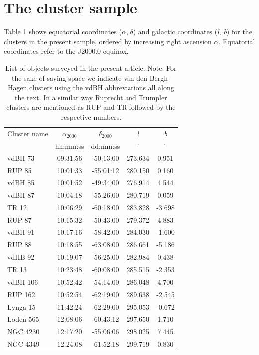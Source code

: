 \documentclass[draft]{aa}
\begin{document}
\section{The cluster sample}
\label{sec:clust_sample}

Table \ref{tab:clust_list} shows equatorial coordinates ($\alpha$, $\delta$) and
galactic coordinates (\textit{l}, \textit{b}) for the clusters in the present
sample, ordered by increasing right ascension $\alpha$. Equatorial coordinates
refer to the J2000.0 equinox.

\begin{table}[ht]
    \centering
    \begin{tabular}{lcccc}
    \hline 
        Cluster name & $\alpha_{2000}$ & $\delta_{2000}$ & \emph{l} & \emph{b}\\
         & hh:mm:ss & dd:mm:ss & $^\circ$ & $^\circ$\\
       \hline \hline 
        vdBH 73 & 09:31:56 & -50:13:00 & 273.634 & 0.951\\
        RUP 85 & 10:01:33 & -55:01:12 &280.150 & 0.160\\
        vdBH 85 & 10:01:52 & -49:34:00 & 276.914 & 4.544\\
        vdBH 87 & 10:04:18 & -55:26:00 & 280.719 & 0.059\\
        TR 12 & 10:06:29 & -60:18:00 & 283.828 & -3.698\\
        RUP 87 & 10:15:32 & -50:43:00 & 279.372 & 4.883\\
        vdBH 91 & 10:17:16 & -58:42:00 & 284.030 & -1.600\\
        RUP 88 & 10:18:55 & -63:08:00 & 286.661 & -5.186\\
        vdHB 92 & 10:19:07 & -56:25:00 & 282.984 & 0.438\\
        TR 13 & 10:23:48 & -60:08:00 & 285.515 & -2.353\\
        vdBH 106 & 10:52:42 & -54:14:00 & 286.048 & 4.700\\
        RUP 162 & 10:52:54 & -62:19:00 & 289.638 & -2.545\\
        Lynga 15 & 11:42:24 & -62:29:00 & 295.053 & -0.672\\
        Loden 565 & 12:08:06 & -60:43:12 & 297.650 & 1.710\\
        NGC 4230 & 12:17:20 & -55:06:06 & 298.025 & 7.445\\
        NGC 4349 & 12:24:08 & -61:52:18 & 299.719 & 0.830\\
        \hline
    \end{tabular}
    \caption{List of objects surveyed in the present article.
    Note: For the sake of saving space we indicate van den Bergh-Hagen
    clusters using the vdBH abbreviations all along the text. In a similar
    way Ruprecht and Trumpler clusters are mentioned as RUP and TR followed
    by the respective numbers.}
    \label{tab:clust_list}
\end{table}
\end{document}
